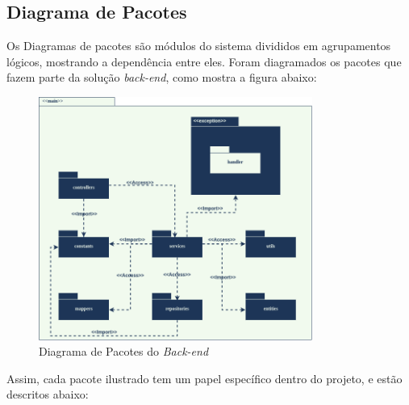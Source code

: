 \subsection{Diagrama de Pacotes}

Os Diagramas de pacotes são módulos do sistema divididos em agrupamentos lógicos, mostrando a dependência entre eles.
Foram diagramados os pacotes que fazem parte da solução \emph{back-end}, como mostra a figura abaixo:

\begin{figure}[H]
    \centering
    \includegraphics[width=0.8\textwidth]{figuras/software/diagrama-pacote.png}
    \caption{Diagrama de Pacotes do \emph{Back-end}}
    \label{fig:pacotes-diagrama}
\end{figure}

Assim, cada pacote ilustrado tem um papel específico dentro do projeto, e estão descritos abaixo:

